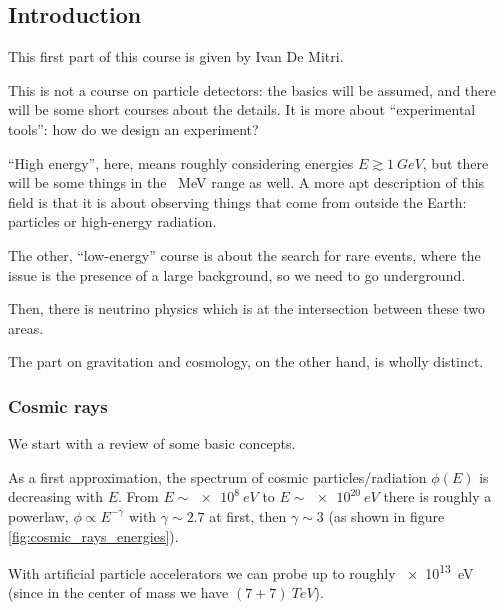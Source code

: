 \documentclass[main.tex]{subfiles}
\begin{document}
\subsection*{Introduction}


This first part of this course is given by Ivan De Mitri. 

This is not a course on particle detectors: the basics will be assumed, and there will be some short courses about the details. 
It is more about ``experimental tools'': how do we design an experiment? 

``High energy'', here, means roughly considering energies \(E \gtrsim \SI{1}{GeV}\), but there will be some things in the \SI{}{MeV} range as well. 
A more apt description of this field is that it is about observing things that come from outside the Earth: particles or high-energy radiation. 

The other, ``low-energy'' course is about the search for rare events, where the issue is the presence of a large background, so we need to go underground. 

Then, there is neutrino physics which is at the intersection between these two areas. 

The part on gravitation and cosmology, on the other hand, is wholly distinct. 

\subsubsection*{Cosmic rays}

We start with a review of some basic concepts. 

As a first approximation, the spectrum of cosmic particles/radiation \(\phi (E)\) is decreasing with \(E\). 
From \(E \sim \SI{e8}{eV}\) to \(E \sim \SI{e20}{eV}\) there is roughly a powerlaw, \(\phi \propto E^{-\gamma }\) with \(\gamma \sim 2.7\) at first, then \(\gamma \sim 3\) (as shown in figure \ref{fig:cosmic_rays_energies}). 

With artificial particle accelerators we can probe up to roughly \SI{e13}{eV} (since in the center of mass we have \((7 + 7) \SI{}{TeV}\)). 

\end{document}
